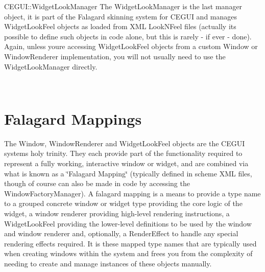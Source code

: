 \begin{DoxyParagraph}{C\+E\+G\+UI\+::Widget\+Look\+Manager}
The Widget\+Look\+Manager is the last manager object, it is part of the Falagard skinning system for C\+E\+G\+UI and manages Widget\+Look\+Feel objects as loaded from X\+ML Look\+N\+Feel files (actually it\textquotesingle{}s possible to define such objects in code alone, but this is rarely -\/ if ever -\/ done). Again, unless you\textquotesingle{}re accessing Widget\+Look\+Feel objects from a custom Window or Window\+Renderer implementation, you will not usually need to use the Widget\+Look\+Manager directly.
\end{DoxyParagraph}
~\newline
 \hypertarget{arch_overview_arch_overview_falmaps}{}\section{Falagard Mappings}\label{arch_overview_arch_overview_falmaps}
The Window, Window\+Renderer and Widget\+Look\+Feel objects are the C\+E\+G\+UI system\textquotesingle{}s \textquotesingle{}holy trinity\textquotesingle{}. They each provide part of the functionality required to represent a fully working, interactive window or widget, and are combined via what is known as a \char`\"{}\+Falagard Mapping\char`\"{} (typically defined in scheme X\+ML files, though of course can also be made in code by accessing the Window\+Factory\+Manager). A falagard mapping is a means to provide a type name to a grouped concrete window or widget type providing the core logic of the widget, a window renderer providing high-\/level rendering instructions, a Widget\+Look\+Feel providing the lower-\/level definitions to be used by the window and window renderer and, optionally, a Render\+Effect to handle any special rendering effects required. It is these mapped type names that are typically used when creating windows within the system and frees you from the complexity of needing to create and manage instances of these objects manually. 